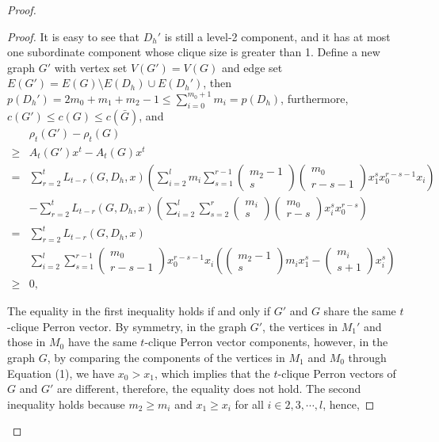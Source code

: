 \documentclass[preprint,12pt]{elsarticle}
\begin{document}
\begin{proof}
\begin{proof}
                It is easy to see that $D_h'$ is still a level-2 component, and it has at most one subordinate component whose clique size is greater than 1. Define a new graph $G'$ with vertex set $V(G') = V(G)$ and edge set $E(G') = E(G) \setminus E(D_h) \cup E(D_h')$, then $p(D_h') = 2m_0+m_1+m_2-1 \leq \sum_{i=0}^{m_0+1}m_i = p(D_h)$, furthermore, $c(G') \leq c(G) \leq c(\bar{G})$, and
                    \begin{align*}
                        &\rho_t(G')-\rho_t(G)
                        \\\geq & A_t(G')x^t-A_t(G)x^t
                        \\= &\sum_{r=2}^t L_{t-r}(G, D_h, x) \left( \sum_{i=2}^l m_i \sum_{s=1}^{r-1} \begin{pmatrix}m_2-1\\s\end{pmatrix} \begin{pmatrix}m_0\\r-s-1\end{pmatrix}x_1^sx_0^{r-s-1}x_i \right)\\
                        &- \sum_{r=2}^t L_{t-r}(G, D_h, x) \left( \sum_{i=2}^l \sum_{s=2}^{r} \begin{pmatrix}m_i\\s\end{pmatrix} \begin{pmatrix}m_0\\r-s\end{pmatrix}x_i^{s}x_0^{r-s} \right)
                        \\= &\sum_{r=2}^t L_{t-r}(G, D_h, x) \\
                        &\sum_{i=2}^l \sum_{s=1}^{r-1}\begin{pmatrix}m_0\\r-s-1\end{pmatrix}x_0^{r-s-1}x_i\left( \begin{pmatrix}m_2-1\\s\end{pmatrix}m_ix_1^s-\begin{pmatrix}m_i\\s+1\end{pmatrix}x_i^s \right)
                        \\\geq &0,
                    \end{align*}

                The equality in the first inequality holds if and only if $G'$ and $G$ share the same $t$-clique Perron vector.
                By symmetry, in the graph $G'$, the vertices in $M_1'$ and those in $M_0$ have the same $t$-clique Perron vector components,
                however, in the graph $G$, by comparing the components of the vertices in $M_1 $ and $M_0 $ through Equation (1), we have $x_0 > x_1$, which implies that the $t$-clique Perron vectors of $G$ and $G'$ are different, therefore, the equality does not hold. The second inequality holds because $m_2 \geq m_i$ and $x_1 \geq x_i$ for all $i \in {2, 3, \cdots, l}$, hence,


\end{proof}
\end{proof}
\end{document}
